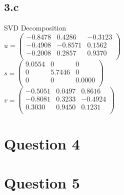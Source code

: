 \documentclass{article}
\begin{document}
\subsection*{3.c}
SVD Decomposition\\
$u =
\begin{pmatrix}
   -0.8478  &  0.4286  & -0.3123\\
   -0.4908  & -0.8571  &  0.1562\\
   -0.2008  &  0.2857  &  0.9370\\
\end{pmatrix}$\\

$s =
\begin{pmatrix}
    9.0554   &      0   &     0 \\
         0   & 5.7446   &      0\\
         0   &      0   & 0.0000\\
\end{pmatrix}$\\

$v =
\begin{pmatrix}
   -0.5051  &  0.0497  &  0.8616\\
   -0.8081  &  0.3233  & -0.4924\\
    0.3030  &  0.9450  &  0.1231\\
\end{pmatrix}$
\section{Question 4}
\section{Question 5}
\end{document}
